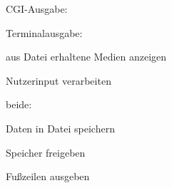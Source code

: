 C\+G\+I-\/\+Ausgabe\+:

Terminalausgabe\+:


\begin{DoxyItemize}
\item aus Datei erhaltene Medien anzeigen
\item Nutzerinput verarbeiten
\end{DoxyItemize}

beide\+:


\begin{DoxyItemize}
\item Daten in Datei speichern
\item Speicher freigeben
\item Fußzeilen ausgeben 
\end{DoxyItemize}